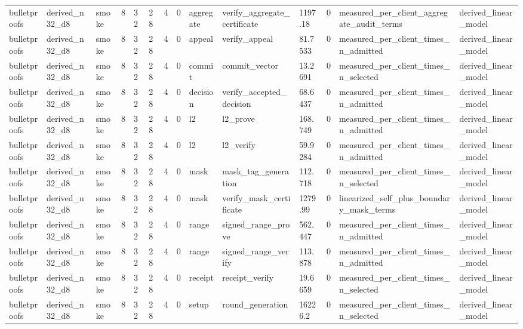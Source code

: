 \begin{table}[t]
\begin{tabular}{llllllllllllll}
bulletproofs & derived\_n32\_d8 & smoke & 8 & 32 & 28 & 4 & 0 & aggregate & verify\_aggregate\_certificate & 1197.18 & 0 & measured\_per\_client\_aggregate\_audit\_terms & derived\_linear\_model \\
bulletproofs & derived\_n32\_d8 & smoke & 8 & 32 & 28 & 4 & 0 & appeal & verify\_appeal & 81.7533 & 0 & measured\_per\_client\_times\_n\_admitted & derived\_linear\_model \\
bulletproofs & derived\_n32\_d8 & smoke & 8 & 32 & 28 & 4 & 0 & commit & commit\_vector & 13.2691 & 0 & measured\_per\_client\_times\_n\_selected & derived\_linear\_model \\
bulletproofs & derived\_n32\_d8 & smoke & 8 & 32 & 28 & 4 & 0 & decision & verify\_accepted\_decision & 68.6437 & 0 & measured\_per\_client\_times\_n\_admitted & derived\_linear\_model \\
bulletproofs & derived\_n32\_d8 & smoke & 8 & 32 & 28 & 4 & 0 & l2 & l2\_prove & 168.749 & 0 & measured\_per\_client\_times\_n\_admitted & derived\_linear\_model \\
bulletproofs & derived\_n32\_d8 & smoke & 8 & 32 & 28 & 4 & 0 & l2 & l2\_verify & 59.9284 & 0 & measured\_per\_client\_times\_n\_admitted & derived\_linear\_model \\
bulletproofs & derived\_n32\_d8 & smoke & 8 & 32 & 28 & 4 & 0 & mask & mask\_tag\_generation & 112.718 & 0 & measured\_per\_client\_times\_n\_selected & derived\_linear\_model \\
bulletproofs & derived\_n32\_d8 & smoke & 8 & 32 & 28 & 4 & 0 & mask & verify\_mask\_certificate & 1279.99 & 0 & linearized\_self\_plus\_boundary\_mask\_terms & derived\_linear\_model \\
bulletproofs & derived\_n32\_d8 & smoke & 8 & 32 & 28 & 4 & 0 & range & signed\_range\_prove & 562.447 & 0 & measured\_per\_client\_times\_n\_admitted & derived\_linear\_model \\
bulletproofs & derived\_n32\_d8 & smoke & 8 & 32 & 28 & 4 & 0 & range & signed\_range\_verify & 113.878 & 0 & measured\_per\_client\_times\_n\_admitted & derived\_linear\_model \\
bulletproofs & derived\_n32\_d8 & smoke & 8 & 32 & 28 & 4 & 0 & receipt & receipt\_verify & 19.6659 & 0 & measured\_per\_client\_times\_n\_selected & derived\_linear\_model \\
bulletproofs & derived\_n32\_d8 & smoke & 8 & 32 & 28 & 4 & 0 & setup & round\_generation & 16226.2 & 0 & measured\_per\_client\_times\_n\_selected & derived\_linear\_model \\

\end{tabular}
\end{table}
